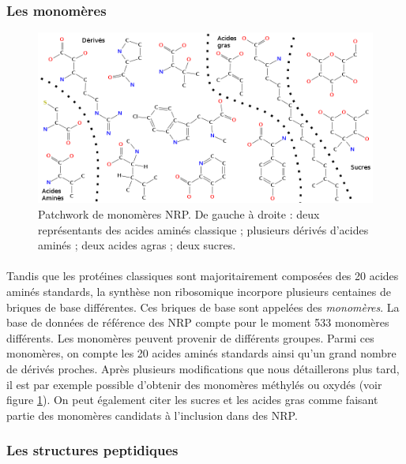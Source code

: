 \documentclass[12pt,french,twoside]{report}
\begin{document}
\subsubsection{Les monomères}

\begin{figure}[h!]
  \begin{center}
    \includegraphics[width=450px]{Figures/bio/Intro/monos/monos.png}
    \caption{\label{monomers_example}Patchwork de monomères NRP.
    De gauche à droite : deux représentants des acides aminés classique ; plusieurs dérivés d'acides aminés ; deux acides agras ; deux sucres.}
  \end{center}
\end{figure}

\paragraph{}Tandis que les protéines classiques sont majoritairement composées des 20 acides aminés standards, la synthèse non ribosomique incorpore plusieurs centaines de briques de base différentes.
Ces briques de base sont appelées des {\em monomères}.
La base de données de référence des NRP compte pour le moment 533 monomères différents.
Les monomères peuvent provenir de différents groupes.
Parmi ces monomères, on compte les 20 acides aminés standards ainsi qu'un grand nombre de dérivés proches.
Après plusieurs modifications que nous détaillerons plus tard, il est par exemple possible d'obtenir des monomères méthylés ou oxydés (voir figure \ref{monomers_example}).
On peut également citer les sucres et les acides gras comme faisant partie des monomères candidats à l'inclusion dans des NRP.


\subsubsection{Les structures peptidiques}
\end{document}
